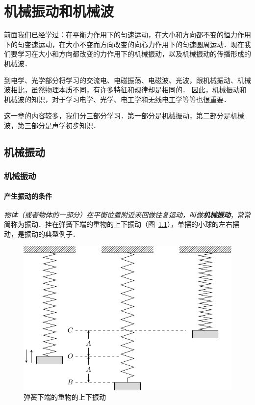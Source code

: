 \chapter{机械振动和机械波}\label{chapter-mechanical-vibration-and-wave}


前面我们已经学过：在平衡力作用下的匀速运动，在大小和方向都不变的恒力作用下的匀变速运动，在大小不变而方向改变的向心力作用下的匀速圆周运动．现在我们要学习在大小和方向都改变的力作用下的机械振动，以及机械振动的传播形成的机械波．

到电学、光学部分将学习的交流电、电磁振荡、电磁波、光波，跟机械振动、机械波相比，虽然物理本质不同，有许多特征和规律却是相同的．
因此，机械振动和机械波的知识，对于学习电学、光学、电工学和无线电工学等等也很重要．

这一章的内容较多，我们分三部分学习．第一部分是机械振动，第二部分是机械波，第三部分是声学初步知识．


\section{机械振动}
\subsection{机械振动}

\subsubsection{产生振动的条件} 

\textit{物体（或者物体的一部分）在平衡位置附近来回做往复运动，叫做\textbf{机械振动}}，常常简称为振动．挂在弹簧下端的重物的上下振动（图~\ref{fig_A_9-1}），单摆的小球的左右摆动，是振动的典型例子．

\begin{figure}[htbp]
	\centering
	\includegraphics{fig/A/9-1.pdf}
	\caption{弹簧下端的重物的上下振动}\label{fig_A_9-1}
\end{figure}



